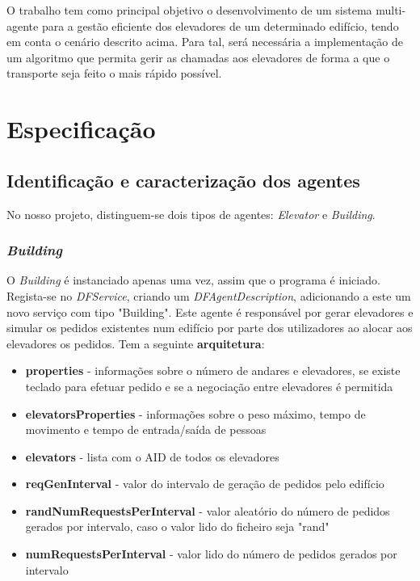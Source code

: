 \documentclass[a4paper]{article}
\begin{document}
O trabalho tem como principal objetivo o desenvolvimento de um sistema multi-agente para a gestão eficiente dos elevadores de um determinado edifício, tendo em conta o cenário descrito acima. Para tal, será necessária a implementação de um algoritmo que permita gerir as chamadas aos elevadores de forma a que o transporte seja feito o mais rápido possível.

\newpage

\section{Especificação}

\subsection{Identificação e caracterização dos agentes} 

No nosso projeto, distinguem-se dois tipos de agentes: \textit{Elevator} e \textit{Building}.

\subsubsection {\textit{Building}}

O \textit{Building} é instanciado apenas uma vez, assim que o programa é iniciado. Regista-se no \textit{DFService}, criando um \textit{DFAgentDescription}, adicionando a este um novo serviço com tipo "Building". Este agente é responsável por gerar elevadores e simular os pedidos existentes num edifício por parte dos utilizadores ao alocar aos elevadores os pedidos. Tem a seguinte \textbf{arquitetura}:

\begin{itemize}
\item \textbf{properties} - informações sobre o número de andares e elevadores, se existe teclado para efetuar pedido e se a negociação entre elevadores é permitida
\item \textbf{elevatorsProperties} - informações sobre o peso máximo, tempo de movimento e tempo de entrada/saída de pessoas
\item \textbf{elevators} - lista com o AID de todos os elevadores
\item \textbf{reqGenInterval} - valor do intervalo de geração de pedidos pelo edifício
\item \textbf{randNumRequestsPerInterval} - valor aleatório do número de pedidos gerados por intervalo, caso o valor lido do ficheiro seja "rand"
\item \textbf{numRequestsPerInterval} - valor lido do número de pedidos gerados por intervalo
\end{itemize}
\end{document}

